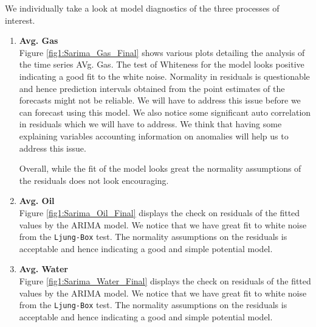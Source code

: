 \documentclass[a4paper]{article}
\begin{document}
\begin{enumerate}
We individually take a look at model diagnostics of the three processes of interest. 

\begin{enumerate}
	\item \textbf{Avg. Gas} \\
	
	Figure \ref{fig1:Sarima_Gas_Final} shows various plots detailing the analysis of the time series AVg. Gas. The test of Whiteness for the model looks positive indicating a good fit to the white noise. Normality in residuals is questionable and hence prediction intervals obtained from the point estimates of the forecasts might not be reliable. We will have to address this issue before we can forecast using this model. We also notice some significant auto correlation  in residuals which we will have to address. We think that having some explaining variables accounting information on anomalies will help us to address this issue. 
	
	Overall, while the fit of the model looks great the normality assumptions of the residuals does not look encouraging. 
	
	\item \textbf{Avg. Oil} \\
	
	Figure \ref{fig1:Sarima_Oil_Final} displays the check on residuals of the fitted values by the ARIMA model. We notice that we have great fit to white noise from the \verb|Ljung-Box| test. The normality assumptions on the residuals is acceptable and hence indicating a good and simple potential model.  
	
	\item \textbf{Avg. Water} \\
	
		Figure \ref{fig1:Sarima_Water_Final} displays the check on residuals of the fitted values by the ARIMA model. We notice that we have great fit to white noise from the \verb|Ljung-Box| test. The normality assumptions on the residuals is acceptable and hence indicating a good and simple potential model. 
		
\end{enumerate}



\end{enumerate}
\end{document}
